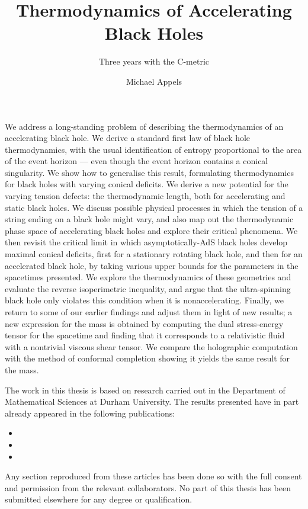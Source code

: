 \documentclass[
twoside,
openright,
frontopenright,
]{dmathesis}
\begin{document}
\title{Thermodynamics of Accelerating Black Holes}
\subtitle{Three years with the C-metric}
\author{Michael Appels}
\maketitlepage*

\begin{abstract*}
  We address a long-standing problem of describing the thermodynamics of an
  accelerating black hole. We derive a standard first law of black hole
  thermodynamics, with the usual identification of entropy proportional to the
  area of the event horizon --- even though the event horizon contains a conical
  singularity. We show how to generalise this result, formulating thermodynamics
  for black holes with varying conical deficits. We derive a new potential for
  the varying tension defects: the thermodynamic length, both for accelerating
  and static black holes. We discuss possible physical processes in which the
  tension of a string ending on a black hole might vary, and also map out the
  thermodynamic phase space of accelerating black holes and explore their
  critical phenomena. We then revisit the critical limit in which
  asymptotically-AdS black holes develop maximal conical deficits, first for a
  stationary rotating black hole, and then for an accelerated black hole, by
  taking various upper bounds for the parameters in the spacetimes presented. We
  explore the thermodynamics of these geometries and evaluate the reverse
  isoperimetric inequality, and argue that the ultra-spinning black hole only
  violates this condition when it is nonaccelerating. Finally, we return to
  some of our earlier findings and adjust them in light of new results; a new
  expression for the mass is obtained by computing the dual stress-energy tensor
  for the spacetime and finding that it corresponds to a relativistic fluid with
  a nontrivial viscous shear tensor. We compare the holographic computation
  with the method of conformal completion showing it yields the same result for
  the mass. 
%
\end{abstract*}

\begin{declaration*}
%
  The work in this thesis is based on research carried out in the Department of
  Mathematical Sciences at Durham University. The results presented have in part
  already appeared in the following publications:
  \begin{itemize}
  \item {}
  \item {}
  \item {}
  \end{itemize}
  Any section reproduced from these articles has been done so with the full
  consent and permission from the relevant collaborators. No part of this thesis
  has been submitted elsewhere for any degree or qualification.
%
\end{declaration*}
\end{document}
